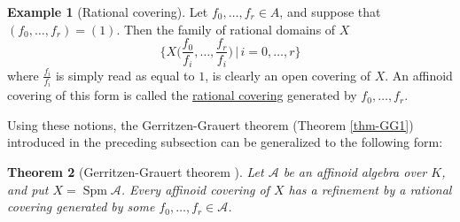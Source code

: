 \documentclass[a4paper,12pt, dvipdfmx]{jsbook}
\def\Spm{\mathop{\mathrm{Spm}}\nolimits}
\theoremstyle{plain}
\newtheorem{thm}{\bfseries Theorem}[section]
\theoremstyle{definition}
\newtheorem{exa}[thm]{\bfseries Example}
\begin{document}
\begin{exa}[Rational covering]\label{exa-rationalcovering}{\rm 
{}
Let $f_0,\ldots,f_r\in A$, and suppose that $(f_0,\ldots,f_r)=(1)$.
Then the family of rational domains of $X$
$$
\big\{X\big({\textstyle \frac{f_0}{f_i},\ldots,\frac{f_r}{f_i}}\big)\,\big|\,i=0,\ldots,r\big\}
$$
where $\frac{f_i}{f_i}$ is simply read as equal to $1$, is clearly an open covering of $X$.
An affinoid covering of this form is called the \underline{rational covering} generated by $f_0,\ldots,f_r$.}
\end{exa}

Using these notions, the Gerritzen-Grauert theorem (Theorem \ref{thm-GG1}) introduced in the preceding subsection can be generalized to the following form:
\begin{thm}[{Gerritzen-Grauert theorem \cite[\S8.2.2, Lemma 2]{BGR}}]\label{thm-GG}{\rm {}
Let $\mathcal{A}$ be an affinoid algebra over $K$, and put $X=\Spm\mathcal{A}$.
Every affinoid covering of $X$ has a refinement by a rational covering generated by some $f_0,\ldots,f_r\in\mathcal{A}$.}
\end{thm}
\end{document}
